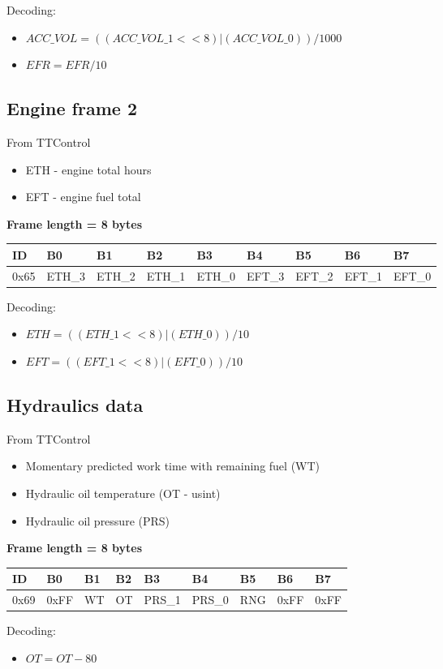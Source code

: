 \documentclass{article}
\begin{document}
Decoding:
\begin{itemize}
    \item $ACC\_VOL = ((ACC\_VOL\_1<<8) | (ACC\_VOL\_0))/1000$
    \item $EFR = EFR/10$
\end{itemize}


\subsection{Engine frame 2}
From TTControl
\begin{itemize}
    \item ETH - engine total hours
    \item EFT - engine fuel total
\end{itemize}{}

\textbf{Frame length = 8 bytes}
\begin{center}
    \begin{tabular}{| p{20pt} | p{40pt} | p{40pt} | p{40pt} | p{40pt} | p{40pt} | p{40pt} | p{40pt} | p{40pt} |}
        \hline
        ID   & B0     & B1     & B2     & B3     & B4     & B5     & B6     & B7     \\
        \hline
        0x65 & ETH\_3 & ETH\_2 & ETH\_1 & ETH\_0 & EFT\_3 & EFT\_2 & EFT\_1 & EFT\_0 \\
        \hline
    \end{tabular}

\end{center}
Decoding:
\begin{itemize}
    \item $ETH = ((ETH\_1<<8) | (ETH\_0))/10$
    \item $EFT = ((EFT\_1<<8) | (EFT\_0))/10$
\end{itemize}

\subsection{Hydraulics data}
From TTControl
\begin{itemize}
    \item Momentary predicted work time with remaining fuel (WT)
    \item Hydraulic oil temperature (OT - usint)
    \item Hydraulic oil pressure (PRS)
\end{itemize}{}

\textbf{Frame length = 8 bytes}
\begin{center}
    \begin{tabular}{| p{20pt} | p{40pt} | p{40pt} | p{40pt} | p{40pt} | p{40pt} | p{40pt} | p{40pt} | p{40pt} |}
        \hline
        ID   & B0   & B1 & B2 & B3     & B4     & B5  & B6   & B7   \\
        \hline
        0x69 & 0xFF & WT & OT & PRS\_1 & PRS\_0 & RNG & 0xFF & 0xFF \\
        \hline
    \end{tabular}
\end{center}
Decoding:
\begin{itemize}
    \item $OT = OT - 80$
\end{itemize}
\end{document}
